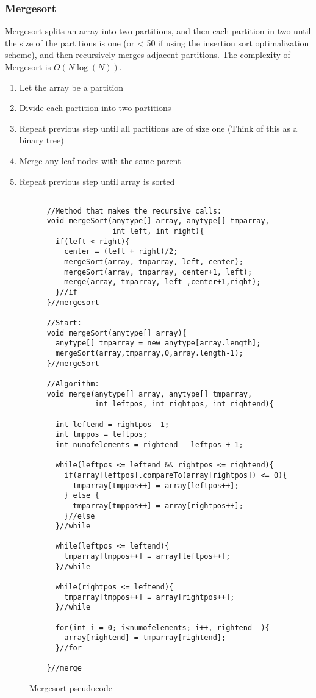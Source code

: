 \documentclass[paper=a4, fontsize=11pt]{scrartcl}
\numberwithin{equation}{section} %
\numberwithin{figure}{section} %
\numberwithin{table}{section} %
\theoremstyle{definition}
\begin{document}
\subsubsection{Mergesort}
Mergesort splits an array into two partitions, and then each partition in two until the size of the partitions is one (or < 50 if using 
the insertion sort optimalization scheme), and then recursively merges adjacent partitions.
The complexity of Mergesort is $O(N\log(N))$.

\begin{enumerate}
  \item Let the array be a partition
  \item Divide each partition into two partitions
  \item Repeat previous step until all partitions are of size one (Think of this as a binary tree)
  \item Merge any leaf nodes with the same parent
  \item Repeat previous step until array is sorted
\end{enumerate}

\begin{figure}[p]
  \begin{verbatim}

    //Method that makes the recursive calls:
    void mergeSort(anytype[] array, anytype[] tmparray, 
                   int left, int right){
      if(left < right){
        center = (left + right)/2;
        mergeSort(array, tmparray, left, center);
        mergeSort(array, tmparray, center+1, left);
        merge(array, tmparray, left ,center+1,right);
      }//if 
    }//mergesort

    //Start: 
    void mergeSort(anytype[] array){
      anytype[] tmparray = new anytype[array.length];
      mergeSort(array,tmparray,0,array.length-1);
    }//mergeSort

    //Algorithm:
    void merge(anytype[] array, anytype[] tmparray, 
               int leftpos, int rightpos, int rightend){

      int leftend = rightpos -1;
      int tmppos = leftpos;
      int numofelements = rightend - leftpos + 1;

      while(leftpos <= leftend && rightpos <= rightend){
        if(array[leftpos].compareTo(array[rightpos]) <= 0){
          tmparray[tmppos++] = array[leftpos++];
        } else {
          tmparray[tmppos++] = array[rightpos++];
        }//else
      }//while

      while(leftpos <= leftend){
        tmparray[tmppos++] = array[leftpos++];
      }//while

      while(rightpos <= leftend){
        tmparray[tmppos++] = array[rightpos++];
      }//while
      
      for(int i = 0; i<numofelements; i++, rightend--){
        array[rightend] = tmparray[rightend];
      }//for

    }//merge

  \end{verbatim}
  \caption{Mergesort pseudocode}
\end{figure}
\end{document}

